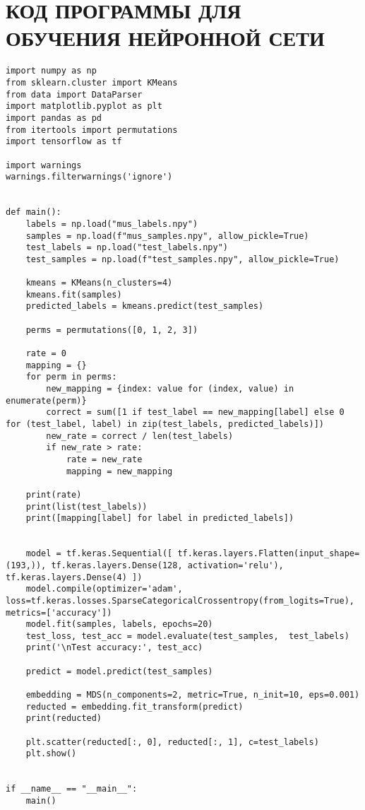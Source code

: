 \section*{\centering КОД ПРОГРАММЫ ДЛЯ ОБУЧЕНИЯ НЕЙРОННОЙ СЕТИ}
\begin{footnotesize}
\begin{lstlisting}
import numpy as np
from sklearn.cluster import KMeans
from data import DataParser
import matplotlib.pyplot as plt
import pandas as pd
from itertools import permutations 
import tensorflow as tf

import warnings
warnings.filterwarnings('ignore')


def main():
    labels = np.load("mus_labels.npy")
    samples = np.load(f"mus_samples.npy", allow_pickle=True)
    test_labels = np.load("test_labels.npy")
    test_samples = np.load(f"test_samples.npy", allow_pickle=True)

    kmeans = KMeans(n_clusters=4)
    kmeans.fit(samples)
    predicted_labels = kmeans.predict(test_samples)

    perms = permutations([0, 1, 2, 3]) 

    rate = 0
    mapping = {}
    for perm in perms:
        new_mapping = {index: value for (index, value) in enumerate(perm)}
        correct = sum([1 if test_label == new_mapping[label] else 0 for (test_label, label) in zip(test_labels, predicted_labels)])
        new_rate = correct / len(test_labels)
        if new_rate > rate:
            rate = new_rate
            mapping = new_mapping

    print(rate)
    print(list(test_labels))
    print([mapping[label] for label in predicted_labels])


    model = tf.keras.Sequential([ tf.keras.layers.Flatten(input_shape=(193,)), tf.keras.layers.Dense(128, activation='relu'), tf.keras.layers.Dense(4) ])
    model.compile(optimizer='adam', loss=tf.keras.losses.SparseCategoricalCrossentropy(from_logits=True), metrics=['accuracy'])
    model.fit(samples, labels, epochs=20)
    test_loss, test_acc = model.evaluate(test_samples,  test_labels)
    print('\nTest accuracy:', test_acc)

    predict = model.predict(test_samples)

    embedding = MDS(n_components=2, metric=True, n_init=10, eps=0.001)
    reducted = embedding.fit_transform(predict)
    print(reducted)

    plt.scatter(reducted[:, 0], reducted[:, 1], c=test_labels)
    plt.show()


if __name__ == "__main__":
    main()
\end{lstlisting}
\end{footnotesize}